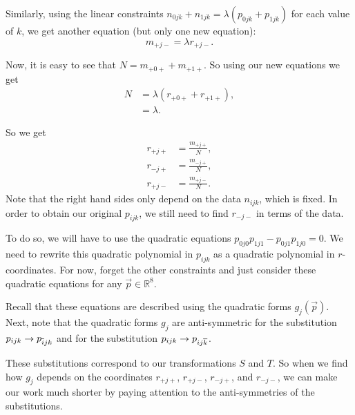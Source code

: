 Similarly, using the linear constraints \(n_{0jk} + n_{1jk} = \lambda (p_{0jk} + p_{1jk})\) for each value of 
\(k\), we get another equation (but only one new equation):
\begin{equation}
m_{+j-} = \lambda r_{+j-}.
\end{equation}

Now, it is easy to see that \(N = m_{+0+} + m_{+1+}\). So using our new equations we get
\begin{align}
N & = \lambda(r_{+0+} + r_{+1+}), \\
& = \lambda. 
\end{align}

So we get
\begin{align}
r_{+j+} & = \frac{m_{+j+}} {N}, \\
r_{-j+} & = \frac{m_{-j+}} {N}, \\
r_{+j-} & = \frac{m_{+j-}} {N}.
\end{align}
Note that the right hand sides only depend on the data \(n_{ijk}\), which is fixed. In order to
obtain our original \(p_{ijk}\), we still need to find \(r_{-j-}\) in terms of the data. 

To do so, we will have to use the quadratic equations \(p_{0j0}p_{1j1} - p_{0j1}p_{1j0} = 0\). 
We need to rewrite this quadratic polynomial in \(p_{ijk}\) as a quadratic polynomial in \(r\)-coordinates.
For now, forget the other constraints and just consider these quadratic equations for 
any \(\vec p \in \mathbb R^8\).

Recall that these equations are described using the quadratic forms \(g_j(\vec p)\). 
Next, note that the quadratic forms \(g_j\) are anti-symmetric for the substitution 
\(p_{ijk} \to p_{\overline{i}jk}\)
and for the substitution \(p_{ijk} \to p_{ij\overline{k}}\).

These substitutions correspond to our transformations \(S\) and \(T\). So when we find how \(g_j\) depends
on the coordinates \(r_{+j+}\), \(r_{+j-}\), \(r_{-j+}\), and \(r_{-j-}\), we can make our work much 
shorter by paying attention to the anti-symmetries of the substitutions.

